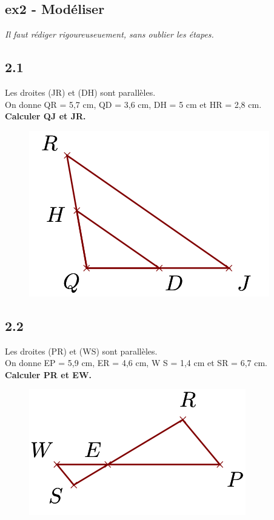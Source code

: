 \documentclass[12pt]{article}
\begin{document}
\subsection*{ex2 - Modéliser}
\textit{Il faut rédiger rigoureuseuement, sans oublier les étapes.}

\begin{multicols}{2}

\subsection*{2.1}

\begin{multicols}{2}

Les droites (JR) et (DH) sont parallèles.\\
On donne QR = 5,7 cm, QD = 3,6 cm, DH = 5 cm et HR = 2,8 cm.\\
\textbf{Calculer QJ et JR.}
\begin{figure}[H]
	\centering
	\includegraphics[width=.5\linewidth]{4x6-thales/sources/th1.png}
\end{figure}

\end{multicols}

\subsection*{2.2}
\begin{multicols}{2}
Les droites (PR) et (WS) sont parallèles.\\
On donne EP = 5,9 cm, ER = 4,6 cm, W S = 1,4 cm et SR = 6,7 cm.\\
\textbf{Calculer PR et EW.}
\begin{figure}[H]
	\centering
	\includegraphics[width=.5\linewidth]{4x6-thales/sources/th2.png}
\end{figure}
\end{multicols}



\end{multicols}
\end{document}
